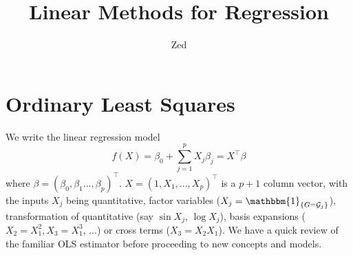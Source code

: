 \documentclass[a4paper, 11pt]{article}
\title{\textbf{Linear Methods for Regression}}
\author{Zed}{}
\begin{document}
\maketitle

\section{Ordinary Least Squares}
We write the linear regression model
$$
f(X) = \beta_0 + \sum_{j=1}^p X_j \beta_j = X^{\top} \beta
$$
where $\beta=(\beta_0, \beta_1..., \beta_p)^{\top}$. $X=(1, X_1, ..., X_p)^{\top}$ is a $p+1$ column vector, with the inputs $X_j$ being quantitative, factor variables ($X_j = \mathbbm{1}_{\{G=\mathcal{G}_j\}}$), transformation of quantitative (say $\sin X_j$, $\log X_j$), basis expansions ($X_2 = X_1^2, X_3 = X_1^3$, ...) or cross terms ($X_3 = X_2 X_1$). We have a quick review of the familiar OLS estimator before proceeding to new concepts and models. 
\end{document}
